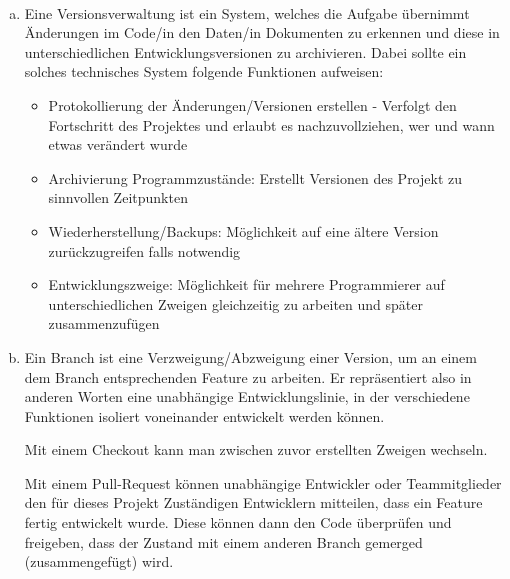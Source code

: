         \begin{loesung}\:
            \\[-.7cm]\begin{enumerate}[(a)]
                \setlength\itemsep{0.1px}
                \item Eine Versionsverwaltung ist ein System, welches die Aufgabe übernimmt Änderungen im Code/in den Daten/in Dokumenten zu erkennen und diese in unterschiedlichen Entwicklungsversionen zu archivieren. Dabei sollte ein solches technisches System folgende Funktionen aufweisen:
                \\[-.7cm]\begin{itemize}
                    \setlength\itemsep{0.1px}
                    \item Protokollierung der Änderungen/Versionen erstellen - Verfolgt den Fortschritt des Projektes und erlaubt es nachzuvollziehen, wer und wann etwas verändert wurde
                    \item Archivierung Programmzustände: Erstellt Versionen des Projekt zu sinnvollen Zeitpunkten
                    \item Wiederherstellung/Backups: Möglichkeit auf eine ältere Version zurückzugreifen falls notwendig
                    \item Entwicklungszweige: Möglichkeit für mehrere Programmierer auf unterschiedlichen Zweigen gleichzeitig zu arbeiten und später zusammenzufügen
                \end{itemize}
            
                \item \:
                \begin{highlighting}[Branch]
                    Ein Branch ist eine Verzweigung/Abzweigung einer Version, um an einem dem Branch entsprechenden Feature zu arbeiten. Er repräsentiert also in anderen Worten eine unabhängige Entwicklungslinie, in der verschiedene Funktionen isoliert voneinander entwickelt werden können.
                \end{highlighting}
            
                \begin{highlighting}[Checkout]
                    Mit einem Checkout kann man zwischen zuvor erstellten Zweigen wechseln.
                \end{highlighting}
            
                \begin{highlighting}
                    Mit einem Pull-Request können unabhängige Entwickler oder Teammitglieder den für dieses Projekt Zuständigen Entwicklern mitteilen, dass ein Feature fertig entwickelt wurde. Diese können dann den Code überprüfen und freigeben, dass der Zustand mit einem anderen Branch gemerged (zusammengefügt) wird.
                \end{highlighting}
            

\end{enumerate}
\end{loesung}
